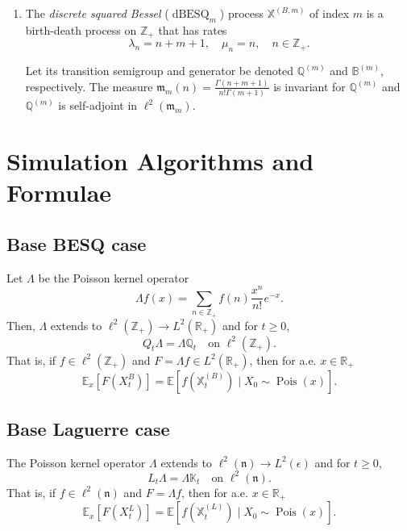 \documentclass[11pt,a4,reqno]{amsart}
\numberwithin{equation}{section}
\theoremstyle{definition}
\theoremstyle{remark}
\newcommand{\bb}[1]{\mathbb{#1}}
\newcommand{\frk}[1]{\mathfrak{#1}}
\newcommand{\E}{\bb{E}}
\newcommand{\R}{\bb{R}}
\newcommand{\Z}{\bb{Z}}
\DeclareMathOperator{\dbesq}{dBESQ}
\DeclareMathOperator{\pois}{Pois}
\newcommand{\beq}{\begin{equation}}
\newcommand{\eeq}{\end{equation}}
\begin{document}
	\begin{enumerate}
	
		\item The \textit{discrete squared Bessel} ($\dbesq_m$) process $\bb{X}^{(B, m)}$ of index $m$ is a birth-death process on $\Z_+$ that has rates
		\beq \lambda_n = n + m + 1, \quad \mu_n = n , \quad n \in \Z_+. \eeq
		
		Let its transition semigroup and generator be denoted $\bb{Q}^{(m)}$ and $\bb{B}^{(m)}$, respectively. The measure $\frk{m}_m(n) = \frac{\Gamma(n + m + 1)}{n! \Gamma(m + 1)}$ is invariant for $\bb{Q}^{(m)}$ and $\bb{Q}^{(m)}$ is self-adjoint in $\ell^2(\frk{m}_m)$. 

	
	
	\end{enumerate}

	


\section{Simulation Algorithms and Formulae}

\subsection{Base BESQ case} 
	Let $\Lambda$ be the Poisson kernel operator 
	\beq \Lambda f(x) = \sum_{n \in \Z_+} f(n) \frac{x^n}{n!} e^{-x} . \eeq
	Then, $\Lambda$ extends to $\ell^2(\Z_+) \to L^2(\R_+)$ and for $t \geq 0$, 
	\beq Q_t\Lambda = \Lambda \bb{Q}_t \quad \text{on } \ell^2(\Z_+). \eeq
	That is, if $f \in \ell^2(\Z_+)$ and $F = \Lambda f \in L^2(\R_+)$, then for a.e. $x \in \R_+$
	\beq \E_x[F(X_t^{B})] = \E[f(\bb{X}_t^{(B)}) \mid X_0 \sim \pois(x)] . \eeq
	
\subsection{Base Laguerre case} 
	The Poisson kernel operator $\Lambda$ extends to $\ell^2(\frk{n}) \to L^2(\epsilon)$ and for $t \geq 0$, 
	\beq L_t\Lambda = \Lambda \bb{K}_t \quad \text{on } \ell^2(\frk{n}). \eeq
	That is, if $f \in \ell^2(\frk{n})$ and $F = \Lambda f$, then for a.e. $x \in \R_+$
	\beq \E_x[F(X_t^{L})] = \E[f(\bb{X}_t^{(L)}) \mid X_0 \sim \pois(x)] . \eeq
	
\end{document}
